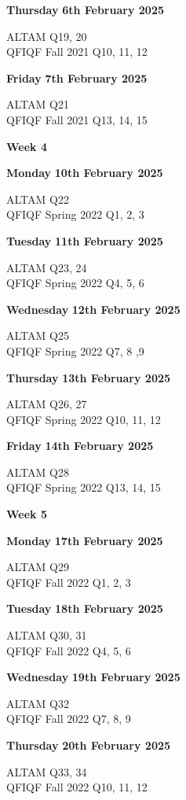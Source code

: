 \documentclass[hidelinks, 12pt]{article}
\theoremstyle{mydefstyle}
\theoremstyle{mythmstyle}
\begin{document}
\textbf{Thursday} \hfill \textbf{6th February 2025}

ALTAM Q19, 20 \\
QFIQF Fall 2021 Q10, 11, 12

\textbf{Friday} \hfill \textbf{7th February 2025}

ALTAM Q21 \\
QFIQF Fall 2021 Q13, 14, 15

\begin{center}
\textbf{Week 4}
\end{center}

\textbf{Monday} \hfill \textbf{10th February 2025}

ALTAM Q22 \\
QFIQF Spring 2022 Q1, 2, 3

\textbf{Tuesday} \hfill \textbf{11th February 2025}

ALTAM Q23, 24 \\
QFIQF Spring 2022 Q4, 5, 6

\textbf{Wednesday} \hfill \textbf{12th February 2025}

ALTAM Q25 \\
QFIQF Spring 2022 Q7, 8 ,9

\textbf{Thursday} \hfill \textbf{13th February 2025}

ALTAM Q26, 27 \\
QFIQF Spring 2022 Q10, 11, 12

\textbf{Friday} \hfill \textbf{14th February 2025}

ALTAM Q28 \\
QFIQF Spring 2022 Q13, 14, 15

\begin{center}
\textbf{Week 5}
\end{center}

\textbf{Monday} \hfill \textbf{17th February 2025}

ALTAM Q29 \\
QFIQF Fall 2022 Q1, 2, 3

\textbf{Tuesday} \hfill \textbf{18th February 2025}

ALTAM Q30, 31 \\
QFIQF Fall 2022 Q4, 5, 6

\textbf{Wednesday} \hfill \textbf{19th February 2025}

ALTAM Q32 \\
QFIQF Fall 2022 Q7, 8, 9

\textbf{Thursday} \hfill \textbf{20th February 2025}

ALTAM Q33, 34 \\
QFIQF Fall 2022 Q10, 11, 12
\end{document}
